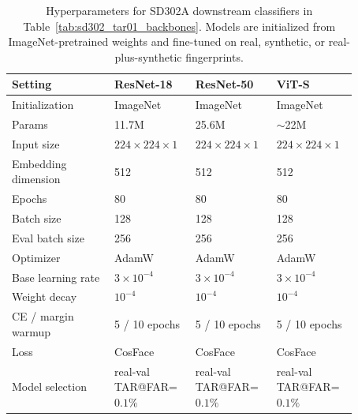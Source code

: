 \documentclass{article}
\begin{document}
\begin{table}[!htbp]
    \centering
    \small
    \caption{Hyperparameters for SD302A downstream classifiers in
    Table~\ref{tab:sd302_tar01_backbones}.  Models are initialized from
    ImageNet-pretrained weights and fine-tuned on real, synthetic, or
    real-plus-synthetic fingerprints.}
    \label{tab:appendix_sd302_classifier_hparams}
    \setlength{\tabcolsep}{4pt}
    \renewcommand{\arraystretch}{1.05}
    \begin{tabular}{p{0.27\linewidth}|p{0.20\linewidth}p{0.20\linewidth}p{0.20\linewidth}}
        \toprule
        Setting & ResNet-18 & ResNet-50 & ViT-S \\
        \midrule
        Initialization & ImageNet & ImageNet & ImageNet \\
        Params & 11.7M & 25.6M & $\sim$22M \\
        Input size & $224\times224\times1$ & $224\times224\times1$ & $224\times224\times1$ \\
        Embedding dimension & 512 & 512 & 512 \\
        Epochs & 80 & 80 & 80 \\
        Batch size & 128 & 128 & 128 \\
        Eval batch size & 256 & 256 & 256 \\
        Optimizer & AdamW & AdamW & AdamW \\
        Base learning rate & $3{\times}10^{-4}$ & $3{\times}10^{-4}$ & $3{\times}10^{-4}$ \\
        Weight decay & $10^{-4}$ & $10^{-4}$ & $10^{-4}$ \\
        CE / margin warmup & 5 / 10 epochs & 5 / 10 epochs & 5 / 10 epochs \\
        Loss & CosFace & CosFace & CosFace \\
        Model selection & real-val TAR@FAR=$0.1\%$ & real-val TAR@FAR=$0.1\%$ & real-val TAR@FAR=$0.1\%$ \\
        \bottomrule
    \end{tabular}
\end{table}
\FloatBarrier
\end{document}
